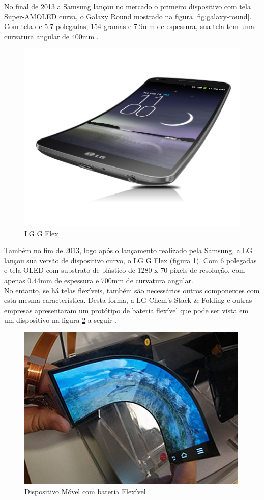 No final de 2013 a Samsung lançou no mercado o primeiro dispositivo com tela Super-AMOLED curva, o Galaxy Round mostrado na figura \ref{fig:galaxy-round}. Com tela de 5.7 polegadas, 154 gramas e 7.9mm de espessura, sua tela tem uma curvatura angular de 400mm \cite{NOLEDDN}.\\

\begin{figure}[!ht]
  \centering
  \includegraphics[width=.60\textwidth]{./figuras/g-flex} 
  \caption{LG G Flex}
  \label{fig:g-flex} 
\end{figure}

Também no fim de 2013, logo após o lançamento realizado pela Samsung, a LG lançou sua versão de dispositivo curvo, o LG G Flex (figura \ref{fig:g-flex}). Com 6 polegadas e tela OLED com substrato de plástico de 1280 x 70 pixels de resolução, com apenas 0.44mm de espessura e 700mm de curvatura angular.\\

No entanto, se há telas flexíveis, também são necessários outros componentes com esta mesma característica. Desta forma, a LG Chem’s Stack \& Folding e outras empresas apresentaram um protótipo de bateria flexível que pode ser vista em um dispositivo na figura \ref{fig:flexible-battery} a seguir \cite{NOLEDDN}.\\

\begin{figure}[!ht]
  \centering
  \includegraphics[width=.60\textwidth]{./figuras/flexible-battery} 
  \caption{Dispositivo Móvel com bateria Flexível}
  \label{fig:flexible-battery} 
\end{figure}


